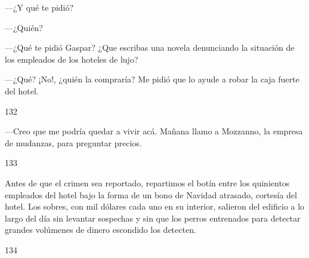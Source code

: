 \documentclass[12pt,twoside,openright,a5paper]{book}
\begin{document}
\nopagebreak

\vspace{0.5cm}

\nopagebreak

---¿Y qué te pidió?

---¿Quién?

---¿Qué te pidió Gaspar? ¿Que escribas una novela denunciando la situación de los empleados de los hoteles de lujo?

---¿Qué? ¡No!, ¿quién la compraría? Me pidió que lo ayude a robar la caja fuerte del hotel.

\vspace{0.5cm}

\hrulefill \hspace{0.1cm}\decofourleft\hspace{0.2cm} 132 \hspace{0.2cm}\decofourright \hspace{0.1cm}\hrulefill

\nopagebreak

\vspace{0.5cm}

\nopagebreak

---Creo que me podría quedar a vivir acá. Mañana llamo a Mozzanno, la empresa de mudanzas, para preguntar precios.

\vspace{0.5cm}

\hrulefill \hspace{0.1cm}\decofourleft\hspace{0.2cm} 133 \hspace{0.2cm}\decofourright \hspace{0.1cm}\hrulefill

\nopagebreak

\vspace{0.5cm}

\nopagebreak

Antes de que el crimen sea reportado, repartimos el botín entre los quinientos
empleados del hotel bajo la forma de un bono de Navidad atrasado, cortesía
del hotel. Los sobres, con mil dólares cada uno en su interior, salieron
del edificio a lo largo del día sin levantar sospechas y sin que los perros
entrenados para detectar grandes volúmenes de dinero escondido los detecten.

\vspace{0.5cm}

\hrulefill \hspace{0.1cm}\decofourleft\hspace{0.2cm} 134 \hspace{0.2cm}\decofourright \hspace{0.1cm}\hrulefill
\end{document}
